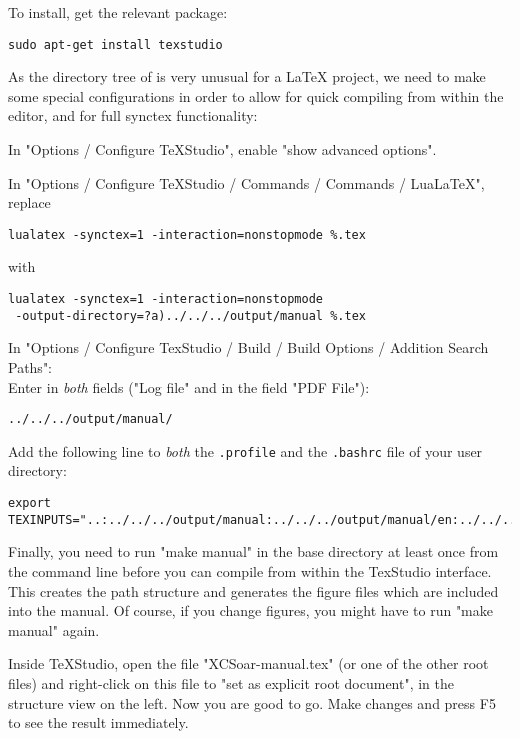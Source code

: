 To install, get the relevant package:

\begin{verbatim}
sudo apt-get install texstudio
\end{verbatim}

As the directory tree of \xc is very unusual for a LaTeX project, we need to make some special configurations in order to allow for quick compiling from within the editor, and for full synctex functionality:

In "Options / Configure TeXStudio", enable "show advanced options".

In "Options / Configure TeXStudio / Commands / Commands / LuaLaTeX", replace
\begin{verbatim}
lualatex -synctex=1 -interaction=nonstopmode %.tex
\end{verbatim}
with
\begin{verbatim}
lualatex -synctex=1 -interaction=nonstopmode
 -output-directory=?a)../../../output/manual %.tex
\end{verbatim}

In "Options / Configure TexStudio / Build / Build Options / Addition Search Paths":\\
Enter in \emph{both} fields ("Log file" and in the field "PDF File"):
\begin{verbatim}
../../../output/manual/
\end{verbatim}


Add the following line to \emph{both} the \texttt{.profile} and the \texttt{.bashrc} file of your user directory:
\begin{maxipage}
\begin{verbatim}
export TEXINPUTS="..:../../../output/manual:../../../output/manual/en:../../..:"
\end{verbatim}
\end{maxipage}


Finally, you need to run "make manual" in the \xc base directory at least once from the command line before you can compile from within the TexStudio interface. This creates the path structure and generates the figure files which are included into the manual. Of course, if you change figures, you might have to run "make manual" again.

Inside TeXStudio, open the file "XCSoar-manual.tex" (or one of the other root files) and right-click on this file to "set as explicit root document", in the structure view on the left. Now you are good to go. Make changes and press F5 to see the result immediately.





